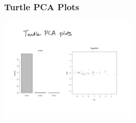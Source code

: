 \documentclass{beamer}
\begin{document}
\begin{frame}
  \frametitle{Turtle PCA Plots}

\begin{center}
\includegraphics[height=2in]{turtle-pca.pdf}
\end{center}
\end{frame}



  





\end{document}
